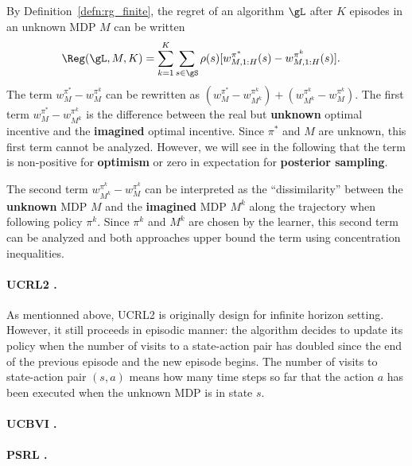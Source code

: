 By Definition~\ref{defn:rg_finite}, the regret of an algorithm $\gL$ after $K$ episodes in an unknown MDP $M$ can be written
\begin{align*}
    \Reg(\gL, M, K) &= \sum_{k=1}^K\sum_{s\in\gS}\rho(s)[w^{\pi^*}_{M,1:H}(s) -w^{\pi^k}_{M,1:H}(s)].
\end{align*}
The term $w^{\pi^*}_M -w^{\pi^k}_M$ can be rewritten as $(w^{\pi^*}_M -w^{\pi^k}_{M^k}) +(w^{\pi^k}_{M^k} -w^{\pi^k}_M)$.
The first term $w^{\pi^*}_M -w^{\pi^k}_{M^k}$ is the difference between the real but \textbf{unknown} optimal incentive and the \textbf{imagined} optimal incentive.
Since $\pi^*$ and $M$ are unknown, this first term cannot be analyzed.
However, we will see in the following that the term is non-positive for \textbf{optimism} or zero in expectation for \textbf{posterior sampling}.

The second term $w^{\pi^k}_{M^k} -w^{\pi^k}_M$ can be interpreted as the ``dissimilarity'' between the \textbf{unknown} MDP $M$ and the \textbf{imagined} MDP $M^k$ along the trajectory when following policy $\pi^k$.
Since $\pi^k$ and $M^k$ are chosen by the learner, this second term can be analyzed and both approaches upper bound the term using concentration inequalities.

\paragraph{UCRL2 \texorpdfstring{\cite{jaksch2010near}}{[JAO10]}.}
As mentionned above, UCRL2 is originally design for infinite horizon setting.
However, it still proceeds in episodic manner: the algorithm decides to update its policy when the number of visits to a state-action pair has doubled since the end of the previous episode and the new episode begins.
The number of visits to state-action pair $(s,a)$ means how many time steps so far that the action $a$ has been executed when the unknown MDP is in state $s$.



\paragraph{UCBVI \texorpdfstring{\cite{azar2017minimax}}{[AOM17]}.}

\paragraph{PSRL \texorpdfstring{\cite{osband2013more}}{[ORV13]}.}


